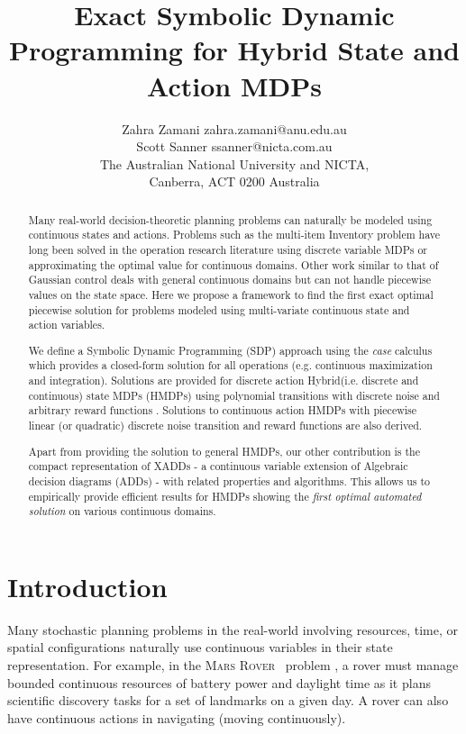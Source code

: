 \documentclass[twoside,11pt]{article}
\newcommand{\MarsRover}{\textsc{Mars Rover }}
\begin{document}
\title{Exact Symbolic Dynamic Programming for Hybrid State and Action MDPs}

\author{\name Zahra Zamani \email zahra.zamani@anu.edu.au \\
       \name Scott Sanner \email ssanner@nicta.com.au \\
       \addr The Australian National University and NICTA,\\
       Canberra, ACT 0200 Australia       
}

\maketitle


\begin{abstract}
Many real-world decision-theoretic planning problems can naturally be modeled using continuous states and actions. Problems such as the multi-item Inventory problem \cite{Scarf_Karlin58} have long been solved in the operation research literature using discrete variable MDPs or approximating the optimal value for continuous domains. Other work similar to that of Gaussian control deals with general continuous domains but can not handle piecewise values on the state space. Here we propose a framework to find the first exact optimal piecewise solution for problems modeled using multi-variate continuous state and action variables.

We define a Symbolic Dynamic Programming (SDP) approach using the \emph{case} calculus which provides a closed-form solution for all operations (e.g. continuous maximization and integration). Solutions are provided for discrete action Hybrid(i.e. discrete and continuous) state MDPs (HMDPs) using polynomial transitions with discrete noise and arbitrary reward functions . Solutions to continuous action HMDPs with piecewise linear (or quadratic) discrete noise transition and reward functions are also derived. 

Apart from providing the solution to general HMDPs, our other contribution is the compact representation of XADDs - a continuous variable extension of Algebraic decision diagrams (ADDs) - with related properties and algorithms. This allows us to empirically provide efficient results for HMDPs showing the \emph{first optimal automated solution} on various continuous domains. 
\end{abstract}

\section{Introduction}
\label{Introduction}
Many stochastic planning problems in the real-world involving resources, time, or spatial configurations naturally use continuous variables in their state representation.  For example, in the \MarsRover\  problem \cite{bresina02}, a rover must manage bounded continuous resources of battery power and daylight time as it plans scientific discovery tasks for a set of landmarks on a given day. A rover can also have continuous actions in navigating (moving continuously). 
\end{document}
